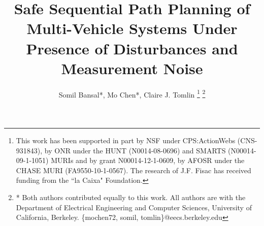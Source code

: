 \documentclass[letterpaper, 10pt, conference]{ieeeconf}      %
\title{\LARGE \bf
Safe Sequential Path Planning of Multi-Vehicle Systems Under Presence of Disturbances and Measurement Noise}
\author{Somil Bansal*, Mo Chen*, Claire J. Tomlin
\thanks{This work has been supported in part by NSF under CPS:ActionWebs (CNS-931843), by ONR under the HUNT (N0014-08-0696) and SMARTS (N00014-09-1-1051) MURIs and by grant N00014-12-1-0609, by AFOSR under the CHASE MURI (FA9550-10-1-0567). The research of J.F. Fisac has received funding from the ``la Caixa" Foundation.}
\thanks{* Both authors contributed equally to this work. All authors are with the Department of Electrical Engineering and Computer Sciences, University of California, Berkeley. \{mochen72, somil, tomlin\}@eecs.berkeley.edu}
}
\begin{document}
\maketitle
\thispagestyle{empty}
\pagestyle{empty}

\begin{abstract}
\end{abstract}















\end{document}
